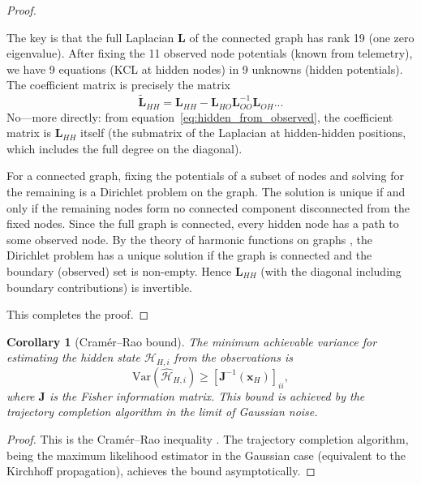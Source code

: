 \documentclass[twocolumn,10pt,a4paper]{article}
\newtheorem{corollary}[theorem]{Corollary}
\theoremstyle{definition}
\theoremstyle{remark}
\newcommand{\Hcal}{\mathcal{H}}
\newcommand{\vect}[1]{\boldsymbol{#1}}
\newcommand{\mat}[1]{\mathbf{#1}}
\begin{document}
\begin{proof}
\begin{itemize}
    The key is that the full Laplacian $\mat{L}$ of the connected graph has rank 19 (one zero eigenvalue). After fixing the 11 observed node potentials (known from telemetry), we have 9 equations (KCL at hidden nodes) in 9 unknowns (hidden potentials). The coefficient matrix is precisely the matrix
    \begin{equation}
        \tilde{\mat{L}}_{HH} = \mat{L}_{HH} - \mat{L}_{HO} \mat{L}_{OO}^{-1} \mat{L}_{OH}...
    \end{equation}
    No---more directly: from equation~\eqref{eq:hidden_from_observed}, the coefficient matrix is $\mat{L}_{HH}$ itself (the submatrix of the Laplacian at hidden-hidden positions, which includes the full degree on the diagonal).

    For a connected graph, fixing the potentials of a subset of nodes and solving for the remaining is a Dirichlet problem on the graph. The solution is unique if and only if the remaining nodes form no connected component disconnected from the fixed nodes. Since the full graph is connected, every hidden node has a path to some observed node. By the theory of harmonic functions on graphs \citep{Chung1997}, the Dirichlet problem has a unique solution if the graph is connected and the boundary (observed) set is non-empty. Hence $\mat{L}_{HH}$ (with the diagonal including boundary contributions) is invertible.
\end{itemize}
This completes the proof.
\end{proof}

\begin{corollary}[Cram\'{e}r--Rao bound]\label{cor:cramer_rao}
The minimum achievable variance for estimating the hidden state $\Hcal_{H,i}$ from the observations is
\begin{equation}\label{eq:cramer_rao}
    \mathrm{Var}(\hat{\Hcal}_{H,i}) \geq [\mat{J}^{-1}(\vect{x}_H)]_{ii},
\end{equation}
where $\mat{J}$ is the Fisher information matrix. This bound is achieved by the trajectory completion algorithm in the limit of Gaussian noise.
\end{corollary}

\begin{proof}
This is the Cram\'{e}r--Rao inequality \citep{CramerRao1945, Kay1993}. The trajectory completion algorithm, being the maximum likelihood estimator in the Gaussian case (equivalent to the Kirchhoff propagation), achieves the bound asymptotically.
\end{proof}
\end{document}
